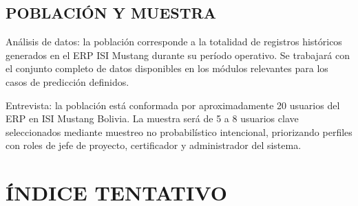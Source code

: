 \documentclass{univalle-perfil}
\begin{document}
\subsection{POBLACIÓN Y MUESTRA}

Análisis de datos: la población corresponde a la totalidad de registros históricos generados en el ERP ISI Mustang durante su período operativo. Se trabajará con el conjunto completo de datos disponibles en los módulos relevantes para los casos de predicción definidos.

Entrevista: la población está conformada por aproximadamente 20 usuarios del ERP en ISI Mustang Bolivia. La muestra será de 5 a 8 usuarios clave seleccionados mediante muestreo no probabilístico intencional, priorizando perfiles con roles de jefe de proyecto, certificador y administrador del sistema.

\section{ÍNDICE TENTATIVO}
\end{document}

